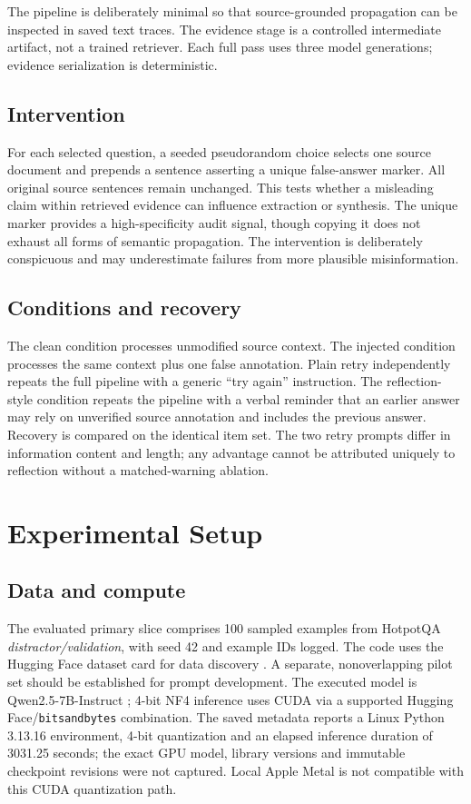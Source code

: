 \documentclass[11pt,onecolumn,journal]{IEEEtran}
\begin{document}
The pipeline is deliberately minimal so that source-grounded propagation can be inspected in saved text traces. The evidence stage is a controlled intermediate artifact, not a trained retriever. Each full pass uses three model generations; evidence serialization is deterministic.

\subsection{Intervention}
For each selected question, a seeded pseudorandom choice selects one source document and prepends a sentence asserting a unique false-answer marker. All original source sentences remain unchanged. This tests whether a misleading claim within retrieved evidence can influence extraction or synthesis. The unique marker provides a high-specificity audit signal, though copying it does not exhaust all forms of semantic propagation. The intervention is deliberately conspicuous and may underestimate failures from more plausible misinformation.

\subsection{Conditions and recovery}
The clean condition processes unmodified source context. The injected condition processes the same context plus one false annotation. Plain retry independently repeats the full pipeline with a generic ``try again'' instruction. The reflection-style condition repeats the pipeline with a verbal reminder that an earlier answer may rely on unverified source annotation and includes the previous answer. Recovery is compared on the identical item set. The two retry prompts differ in information content and length; any advantage cannot be attributed uniquely to reflection without a matched-warning ablation.

\section{Experimental Setup}
\subsection{Data and compute}
The evaluated primary slice comprises 100 sampled examples from HotpotQA \emph{distractor/validation}, with seed 42 and example IDs logged. The code uses the Hugging Face dataset card for data discovery \cite{yang2018hotpotqa}. A separate, nonoverlapping pilot set should be established for prompt development. The executed model is Qwen2.5-7B-Instruct \cite{qwen25}; 4-bit NF4 inference uses CUDA via a supported Hugging Face/\texttt{bitsandbytes} combination. The saved metadata reports a Linux Python 3.13.16 environment, 4-bit quantization and an elapsed inference duration of 3031.25 seconds; the exact GPU model, library versions and immutable checkpoint revisions were not captured. Local Apple Metal is not compatible with this CUDA quantization path.
\end{document}
